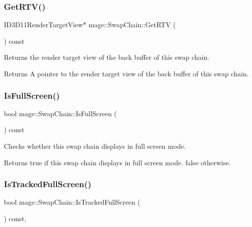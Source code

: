\subsubsection{\texorpdfstring{Get\+R\+T\+V()}{GetRTV()}}
{\footnotesize\ttfamily I\+D3\+D11\+Render\+Target\+View$\ast$ mage\+::\+Swap\+Chain\+::\+Get\+R\+TV (\begin{DoxyParamCaption}{ }\end{DoxyParamCaption}) const\hspace{0.3cm}{\ttfamily [noexcept]}}

Returns the render target view of the back buffer of this swap chain.

\begin{DoxyReturn}{Returns}
A pointer to the render target view of the back buffer of this swap chain. 
\end{DoxyReturn}
\hypertarget{classmage_1_1_swap_chain_a85873ca586fbcd83c237692a011d6d08}{}\label{classmage_1_1_swap_chain_a85873ca586fbcd83c237692a011d6d08} 
\subsubsection{\texorpdfstring{Is\+Full\+Screen()}{IsFullScreen()}}
{\footnotesize\ttfamily bool mage\+::\+Swap\+Chain\+::\+Is\+Full\+Screen (\begin{DoxyParamCaption}{ }\end{DoxyParamCaption}) const\hspace{0.3cm}{\ttfamily [noexcept]}}

Checks whether this swap chain displays in full screen mode.

\begin{DoxyReturn}{Returns}
{\ttfamily true} if this swap chain displays in full screen mode. {\ttfamily false} otherwise. 
\end{DoxyReturn}
\hypertarget{classmage_1_1_swap_chain_ad3b35e10612f7219cc4b6d61039e2f8c}{}\label{classmage_1_1_swap_chain_ad3b35e10612f7219cc4b6d61039e2f8c} 
\subsubsection{\texorpdfstring{Is\+Tracked\+Full\+Screen()}{IsTrackedFullScreen()}}
{\footnotesize\ttfamily bool mage\+::\+Swap\+Chain\+::\+Is\+Tracked\+Full\+Screen (\begin{DoxyParamCaption}{ }\end{DoxyParamCaption}) const\hspace{0.3cm}{\ttfamily [private]}, {\ttfamily [noexcept]}}

